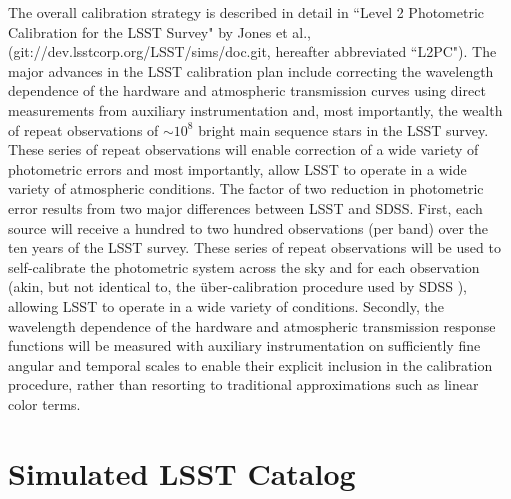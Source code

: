 \documentclass[12pt,preprint]{aastex}
\begin{document}
The overall calibration strategy is described in detail in ``Level 2
Photometric Calibration for the LSST Survey" by Jones et al.,
(git://dev.lsstcorp.org/LSST/sims/doc.git, hereafter abbreviated ``L2PC"). The major advances
in the LSST calibration plan include correcting the wavelength
dependence of the hardware and atmospheric transmission curves using
direct measurements from auxiliary instrumentation and, most
importantly, the wealth of repeat observations of $\sim10^8$ bright
main sequence stars in the LSST survey. These series of repeat
observations will enable correction of a wide variety of photometric
errors and most importantly, allow LSST to operate in a wide variety
of atmospheric conditions.  The factor of two reduction in photometric
error results from two major differences between LSST and SDSS. First,
each source will receive a hundred to two hundred observations (per
band) over the ten years of the LSST survey. These series of repeat
observations will be used to self-calibrate the photometric system
across the sky and for each observation (akin, but not identical to,
the \"{u}ber-calibration procedure used by SDSS
\citep{pad08}), allowing LSST to operate in a wide variety
of conditions. Secondly, the wavelength dependence of the hardware and
atmospheric transmission response functions will be measured with
auxiliary instrumentation on sufficiently fine angular and temporal
scales to enable their explicit inclusion in the calibration
procedure, rather than resorting to traditional approximations such as
linear color terms.










\section{Simulated LSST Catalog}
\end{document}
